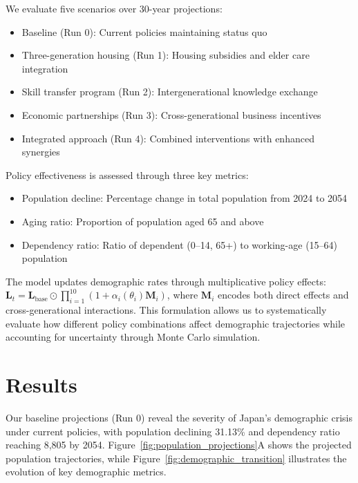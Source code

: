 \documentclass{article} %
\begin{document}
We evaluate five scenarios over 30-year projections:
\begin{itemize}
    \item Baseline (Run 0): Current policies maintaining status quo
    \item Three-generation housing (Run 1): Housing subsidies and elder care integration
    \item Skill transfer program (Run 2): Intergenerational knowledge exchange
    \item Economic partnerships (Run 3): Cross-generational business incentives
    \item Integrated approach (Run 4): Combined interventions with enhanced synergies
\end{itemize}

Policy effectiveness is assessed through three key metrics:
\begin{itemize}
    \item Population decline: Percentage change in total population from 2024 to 2054
    \item Aging ratio: Proportion of population aged 65 and above
    \item Dependency ratio: Ratio of dependent (0--14, 65+) to working-age (15--64) population
\end{itemize}

The model updates demographic rates through multiplicative policy effects: $\mathbf{L}_t = \mathbf{L}_{\text{base}} \odot \prod_{i=1}^{10} (1 + \alpha_i(\theta_i)\mathbf{M}_i)$, where $\mathbf{M}_i$ encodes both direct effects and cross-generational interactions. This formulation allows us to systematically evaluate how different policy combinations affect demographic trajectories while accounting for uncertainty through Monte Carlo simulation.


\section{Results}
\label{sec:results}

Our baseline projections (Run 0) reveal the severity of Japan's demographic crisis under current policies, with population declining 31.13\% and dependency ratio reaching 8,805 by 2054. Figure~\ref{fig:population_projections}A shows the projected population trajectories, while Figure~\ref{fig:demographic_transition} illustrates the evolution of key demographic metrics.
\end{document}
